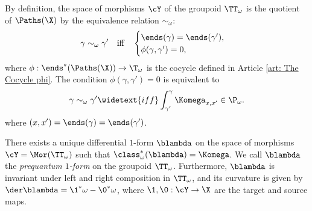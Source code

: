   
  \begin{article}
    \label{art: The Invariant 1-Form}
    
    By definition,
    the space of morphisms $\cY$ of the groupoid $\TT_\omega$ is the quotient of $\Paths(\X)$ by the equivalence relation $\sim_\omega$:
    $$
      \gamma \sim_\omega \gamma' \quad \text{iff} \quad
      \begin{cases}
      \ends(\gamma) = \ends(\gamma'), \\
      \phi(\gamma,\gamma') = 0,
      \end{cases}
      $$
    where $\phi : \ends^*(\Paths(\X)) \to \T_\omega$ is the cocycle defined in Article \ref{art: The Cocycle phi}.
    The condition $\phi(\gamma,\gamma') = 0$ is equivalent to
    $$
      \gamma \sim_\omega \gamma' \widetext{iff} \int_{\gamma'}^{\gamma} \Komega_{x,x'} \in \P_\omega.
      $$
    where $(x,x') = \ends(\gamma) = \ends(\gamma')$.
    
    \begin{theorem}{}
      There exists a unique differential $1$-form $\blambda$ on the space of morphisms $\cY = \Mor(\TT_\omega)$ such that $\class_\omega^*(\blambda) = \Komega$.
      We call $\blambda$ the \emph{prequantum $1$-form} on the groupoid $\TT_\omega$.
      Furthermore, $\blambda$ is invariant under left and right composition in $\TT_\omega$,
      and its curvature is given by $\der\blambda = \1^*\omega - \0^*\omega$,
      where $\1, \0 : \cY \to \X$ are the target and source maps.
    \end{theorem}
    
  \end{article}
  
